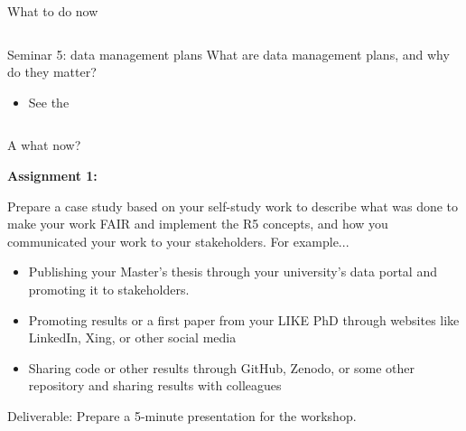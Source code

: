 \begin{frame}{What to do now}
\begin{columns}[t]
\begin{column}{.45\textwidth}
		\begin{block}{Seminar 5: data management plans}
			What are data management plans, and why do they matter?
			\begin{itemize}
				\item See the 
			\end{itemize}
		\end{block}
		\end{column}

	\end{columns}

\end{frame}


\begin{frame}{A what now?}

    \textbf{Assignment 1:}
    
    Prepare a case study based on your self-study work to describe what was done to make your work FAIR and implement the R5 concepts, and how you communicated your work to your stakeholders. For example...
    
    \begin{itemize}
        \item Publishing your Master’s thesis through your university’s data portal and promoting it to stakeholders.
        \item Promoting results or a first paper from your LIKE PhD through websites like LinkedIn, Xing, or other social media
        \item Sharing code or other results through GitHub, Zenodo, or some other repository and sharing results with colleagues
    \end{itemize}
    
    Deliverable: Prepare a 5-minute presentation for the workshop.


\end{frame}

